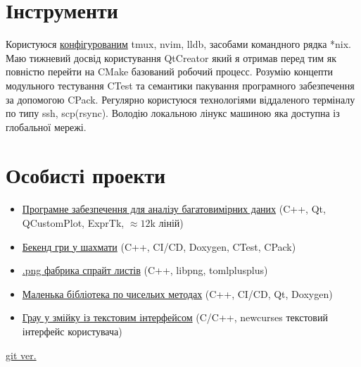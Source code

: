 \section{Інструменти}
Користуюся \href{https://github.com//Dolfost/dotfiles}{конфігурованим} tmux,
nvim, lldb, засобами командного рядка *nix. Маю тижневий досвід користування
QtCreator який я отримав перед тим як повністю перейти на CMake базований
робочий процесс. Розумію концепти модульного тестування CTest та семантики
пакування програмного забезпечення за допомогою CPack. Регулярно користуюся
технологіями віддаленого терміналу по типу ssh, scp(rsync). Володію локальною
лінукс машиною яка доступна із глобальної мережі.

\section{Особисті проекти}
\begin{itemize}
	\item \href{https://github.com/Dolfost/matstat}{Програмне забезпечення для
		аналізу багатовимірних даних} (C++, Qt, QCustomPlot, ExprTk, \(\approx
		12\)k ліній)
	\item \href{https://github.com/Dolfost/tartan}{Бекенд гри у шахмати} (C++,
		CI/CD, Doxygen, CTest, CPack)
	\item \href{https://github.com/Dolfost/ssmk/tree/develop}{.png фабрика спрайт
		листів} (C++, libpng, tomlplusplus)
	\item \href{https://github.com/Dolfost/calgo}{Маленька бібліотека по чисельих
		методах} (C++, CI/CD, Qt, Doxygen) 
	\item \href{https://github.com/Dolfost/snake-cpp}{Грау у змійку із текстовим
		інтерфейсом} (C/C++, newcurses текстовий інтерфейс користувача)
\end{itemize}

\vfill{}

\begin{center}
	\tiny \href{\lrthomepage}{git ver. \lrtversion}
\end{center}


